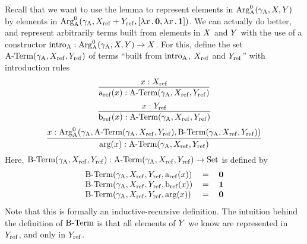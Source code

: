 \documentclass{article}
\begin{document}
Recall that we want to use the lemma to represent elements in
$\text{Arg}^{0}_{\mathrm{A}}(\gamma_{\mathrm{A}}, X, Y)$ by elements in $\text{Arg}^{0}_{\mathrm{A}}(\gamma_{\mathrm{A}}, X_{\mathrm{ref}}
+Y_{\mathrm{ref}}, [\lambda x\,.\,\mathbf{0}, \lambda x\,.\,\mathbf{1}])$. We can actually
do better, and represent arbitrarily terms built from elements in $X$
and $Y$ with the use of a constructor $\text{intro}_{\mathrm{A}} : \text{Arg}^{0}_{\mathrm{A}}(\gamma_{\mathrm{A}}, X,
Y) \to X$. For this, define the set $\text{A-Term}(\gamma_{\mathrm{A}}, X_{\mathrm{ref}}, Y_{\mathrm{ref}})$
of terms ``built from $\text{intro}_{\mathrm{A}}$, $X_{\mathrm{ref}}$ and $Y_{\mathrm{ref}}$'' with
introduction rules
%
\[
\infer{\termAref(x) : \Aterm(\gammaA, \Xref, \Yref)}{x : \Xref}
\]
%
%
\[
\infer{\termBref(x) : \Aterm(\gammaA, \Xref, \Yref)}{x : \Yref}
\]
%
%
\[
\infer{\termArg(x) : \Aterm(\gammaA, \Xref, \Yref)}{x : \ArgAp(\gammaA, \Aterm(\gammaA, \Xref, \Yref), \Bterm(\gammaA, \Xref, \Yref))}
\]
Here, $\text{B-Term}(\gamma_{\mathrm{A}}, X_{\mathrm{ref}}, Y_{\mathrm{ref}}) : \text{A-Term}(\gamma_{\mathrm{A}}, X_{\mathrm{ref}}, Y_{\mathrm{ref}}) \to \text{Set}$ is defined by
\[
\begin{tabular}{lcr}
$\Bterm(\gammaA, \Xref, \Yref, \termAref(x))$ & $=$ & $\zero$ \\
$\Bterm(\gammaA, \Xref, \Yref, \termBref(x))$ & $=$ & $\one$  \\
$\Bterm(\gammaA, \Xref, \Yref, \termArg(x))$  & $=$ & $\zero$
\end{tabular}
\]
Note that this is formally an inductive-recursive definition.
The intuition behind the definition of $\text{B-Term}$ is that all elements of
$Y$ we know are represented in $Y_{\mathrm{ref}}$, and only in $Y_{\mathrm{ref}}$. 
\end{document}
